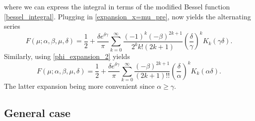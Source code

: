 \documentclass[10pt,a4paper,oneside]{article}
\numberwithin{equation}{section}
\begin{document}
where we can express the integral in terms of the modified Bessel function \eqref{bessel_integral}. Plugging in \eqref{expansion_x=mu_pre}, now yields the alternating series
\begin{equation}\label{series_x=mu_1}
F(\mu; \alpha, \beta, \mu, \delta) = \frac{1}{2} + \frac{\delta e^{\delta \gamma}}{\pi} \sum_{k=0}^{\infty} \frac{(-1)^k (-\beta)^{2k+1}}{2^k k! (2k + 1)} \left(\frac{\delta}{\gamma}\right)^k K_k(\gamma \delta).
\end{equation}
Similarly, using \eqref{phi_expansion_2} yields
\begin{equation}\label{series_x=mu_2}
F(\mu; \alpha, \beta, \mu, \delta) = \frac{1}{2} + \frac{\delta e^{\delta \gamma}}{\pi} \sum_{k=0}^{\infty} \frac{(-\beta)^{2k+1}}{(2k + 1)!!} \left(\frac{\delta}{\alpha}\right)^k K_k(\alpha \delta).
\end{equation}
The latter expansion being more convenient since $\alpha \ge \gamma$.



\subsection{General case}\label{section_general_case}
\end{document}
